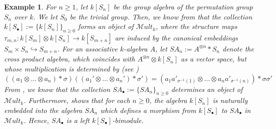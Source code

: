 \documentclass[10pt, colorlinks]{article}
\numberwithin{equation}{section} \DeclareMathSizes{2}{10}{12}{13}
\newtheorem{eg}[thm]{Example}
\begin{document}
     
    \begin{eg}
        \emph{ For $n\geq 1$, let $k[S_n]$ be the group algebra of the permutation group $S_n$ over $k$. We let $S_0$ be the trivial group. Then, we know from \cite[\S 3.1]{DAV} that the collection  $k[S_\bullet]:=\{k[S_n]\}_{n\geq 0}$ forms an object of $\mathscr Mult_k$, where the structure maps $ \tau_{m,n}:k[S_m] \otimes k[S_n]\longrightarrow k[S_{m+n}]$ are induced by the canonical embeddings $S_m\times S_n\hookrightarrow S_{m+n}$. For an associative $k$-algebra $A$, let $SA_n:=A^{\otimes n}\ast S_n$ denote the cross product algebra, 
        which coincides with $A^{\otimes n}\otimes k[S_n]$ as a vector space, but whose multiplication is determined by (see \cite[\S 5]{DAV})
        \begin{equation*}
        ((a_1\otimes ...\otimes a_n)\ast \sigma)((a_1'\otimes ...\otimes a_n')\ast \sigma')=(a_1a'_{\sigma^{-1}(1)}\otimes ...\otimes a_na'_{\sigma^{-1}(n)})\ast \sigma\sigma'
        \end{equation*}
        From \cite[$\S$ 5]{DAV}, we know that the collection $SA_\bullet:=\{SA_n\}_{n\geq 0}$ determines an object of $\mathscr Mult_k$. Furthermore, \cite[\S 5.2]{DAV} shows that for each $n\geq 0$, the algebra $k[S_n]$ is naturally embedded into the algebra $SA_n$ which defines a morphism from $k[S_\bullet]$ to $SA_\bullet$ in $\mathscr Mult_k$. Hence, $SA_\bullet$ is a left $k[S_\bullet]$-bimodule.}
        
    \end{eg}

   
       
\end{document}

